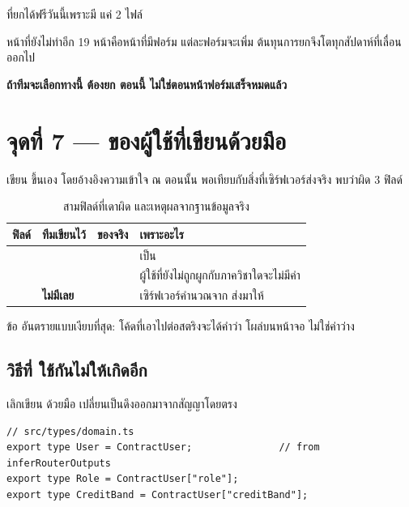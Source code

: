 \begin{warnbox}[title={ข่าวดีนี้มีวันหมดอายุ}]
ที่ยกได้ฟรีวันนี้เพราะมี  แค่ 2 ไฟล์

หน้าที่ยังไม่ทำอีก 19 หน้าคือหน้าที่มีฟอร์ม แต่ละฟอร์มจะเพิ่ม 
ต้นทุนการยกจึงโตทุกสัปดาห์ที่เลื่อนออกไป

\textbf{ถ้าทีมจะเลือกทางนี้ ต้องยก  ตอนนี้ ไม่ใช่ตอนหน้าฟอร์มเสร็จหมดแล้ว}
\end{warnbox}

\section{จุดที่ 7 ---  ของผู้ใช้ที่เขียนด้วยมือ}

 เขียน  ขึ้นเอง
โดยอ้างอิงความเข้าใจ ณ ตอนนั้น พอเทียบกับสิ่งที่เซิร์ฟเวอร์ส่งจริง พบว่าผิด 3 ฟิลด์

\begin{table}[htbp]
\centering
\footnotesize\sansall
\caption{สามฟิลด์ที่เดาผิด และเหตุผลจากฐานข้อมูลจริง}
\label{tab:userdrift}
\begin{tabular}{@{}L{2.7cm}L{2.4cm}L{2.4cm}L{4.9cm}@{}}
\toprule
\textbf{ฟิลด์} & \textbf{ทีมเขียนไว้} & \textbf{ของจริง} & \textbf{เพราะอะไร} \\
\midrule
{} &  &  &
 เป็น  \\
\addlinespace[2pt]
 &  &  &
ผู้ใช้ที่ยังไม่ถูกผูกกับภาควิชาใดจะไม่มีค่า \\
\addlinespace[2pt]
 & \textbf{ไม่มีเลย} &  &
เซิร์ฟเวอร์คำนวณจาก  ส่งมาให้ \\
\bottomrule
\end{tabular}
\end{table}

ข้อ  อันตรายแบบเงียบที่สุด: โค้ดที่เอาไปต่อสตริงจะได้คำว่า
 โผล่บนหน้าจอ ไม่ใช่ค่าว่าง

\subsection{วิธีที่  ใช้กันไม่ให้เกิดอีก}

เลิกเขียน  ด้วยมือ เปลี่ยนเป็นดึงออกมาจากสัญญาโดยตรง

\begin{lstlisting}
// src/types/domain.ts
export type User = ContractUser;               // from inferRouterOutputs
export type Role = ContractUser["role"];
export type CreditBand = ContractUser["creditBand"];
\end{lstlisting}

